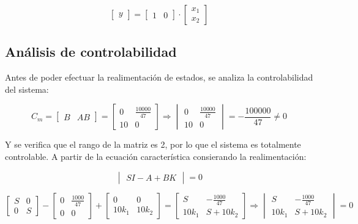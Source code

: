 \documentclass{article}
\begin{document}
\[
\begin{bmatrix}
y
\end{bmatrix}
=
\begin{bmatrix}
1 & 0 
\end{bmatrix}
\cdot
\begin{bmatrix}
x_1 \\
x_2 
\end{bmatrix}
\]

\subsection{Análisis de controlabilidad}
Antes de poder efectuar la realimentación de estados, se analiza la controlabilidad del sistema:

\[
C_m
=
\begin{bmatrix}
B & AB
\end{bmatrix}
=
\begin{bmatrix}
0 & \frac{10000}{47} \\
10 & 0 
\end{bmatrix}
\Longrightarrow
\begin{vmatrix}
0 & \frac{10000}{47} \\
10 & 0 
\end{vmatrix}
=
-\frac{100000}{47}
\not=
0
\]

Y se verifica que el rango de la matriz es 2, por lo que el sistema es totalmente controlable.
A partir de la ecuación característica consierando la realimentación:

\[
\begin{vmatrix}
SI-A+BK
\end{vmatrix}
=0
\]

\[
\begin{bmatrix}
S & 0 \\
0 & S
\end{bmatrix}
-
\begin{bmatrix}
0 & \frac{1000}{47} \\
0 & 0
\end{bmatrix}
+
\begin{bmatrix}
0 & 0 \\
10k_1 & 10k_2
\end{bmatrix}
=
\begin{bmatrix}
S & -\frac{1000}{47} \\
10k_1 & S+10k_2
\end{bmatrix}
\Longrightarrow
\begin{vmatrix}
S & -\frac{1000}{47} \\
10k_1 & S+10k_2
\end{vmatrix}
=0
\]
\end{document}
